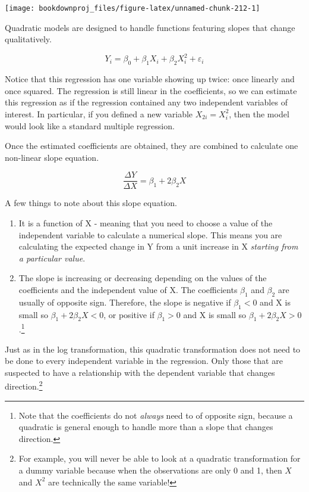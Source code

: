 \documentclass[
]{book}
\begin{document}
\begin{center}\texttt{[image: bookdownproj\_files/figure-latex/unnamed-chunk-212-1]} \end{center}

Quadratic models are designed to handle functions featuring slopes that change qualitatively.

\[Y_i = \beta_0 + \beta_1 X_i + \beta_2 X_i^2 + \varepsilon_i\]

Notice that this regression has one variable showing up twice: once linearly and once squared. The regression is still linear in the coefficients, so we can estimate this regression as if the regression contained any two independent variables of interest. In particular, if you defined a new variable \(X_{2i} = X_i^2\), then the model would look like a standard multiple regression.

Once the estimated coefficients are obtained, they are combined to calculate one non-linear slope equation.

\[\frac{\Delta Y}{\Delta X} = \beta_1 + 2\beta_2  X\]

A few things to note about this slope equation.

\begin{enumerate}
\def\labelenumi{\arabic{enumi}.}
\item
  It is a function of X - meaning that you need to choose a value of the independent variable to calculate a numerical slope. This means you are calculating the expected change in Y from a unit increase in X \emph{starting from a particular value}.
\item
  The slope is increasing or decreasing depending on the values of the coefficients and the independent value of X. The coefficients \(\beta_1\) and \(\beta_2\) are usually of opposite sign. Therefore, the slope is negative if \(\beta_1<0\) and X is small so \(\beta_1 + 2\beta_2  X<0\), or positive if \(\beta_1>0\) and X is small so \(\beta_1 + 2\beta_2 X>0\).\footnote{Note that the coefficients do not \emph{always} need to of opposite sign, because a quadratic is general enough to handle more than a slope that changes direction.}
\end{enumerate}

Just as in the log transformation, this quadratic transformation does not need to be done to every independent variable in the regression. Only those that are suspected to have a relationship with the dependent variable that changes direction.\footnote{For example, you will never be able to look at a quadratic transformation for a dummy variable because when the observations are only 0 and 1, then \(X\) and \(X^2\) are technically the same variable!}
\end{document}
